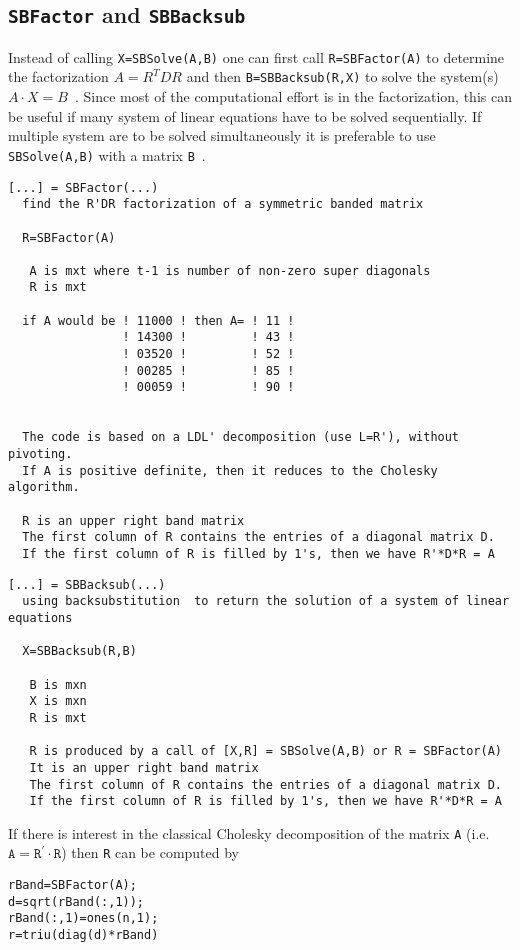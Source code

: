 \documentclass[11pt]{article}
\begin{document}
\subsection{\texttt{SBFactor} and \texttt{SBBacksub}}
Instead of calling \texttt{X=SBSolve(A,B)} one can first call
\texttt{R=SBFactor(A)} to determine the factorization $A=R^TDR$ and
then \texttt{B=SBBacksub(R,X)} to solve the system(s) $A\cdot X=B$~.
Since most of the computational effort is in the factorization, this can be
useful if many system of linear equations have to be solved sequentially.
If multiple system are to be solved simultaneously it is preferable to use
\texttt{SBSolve(A,B)} with a matrix \texttt{B}~.

\begin{verbatim}
[...] = SBFactor(...)
  find the R'DR factorization of a symmetric banded matrix

  R=SBFactor(A)

   A is mxt where t-1 is number of non-zero super diagonals
   R is mxt

  if A would be ! 11000 ! then A= ! 11 !
                ! 14300 !         ! 43 !
                ! 03520 !         ! 52 !
                ! 00285 !         ! 85 !
                ! 00059 !         ! 90 !


  The code is based on a LDL' decomposition (use L=R'), without pivoting.
  If A is positive definite, then it reduces to the Cholesky algorithm.

  R is an upper right band matrix
  The first column of R contains the entries of a diagonal matrix D.
  If the first column of R is filled by 1's, then we have R'*D*R = A
\end{verbatim}

\begin{verbatim}
[...] = SBBacksub(...)
  using backsubstitution  to return the solution of a system of linear equations

  X=SBBacksub(R,B)

   B is mxn
   X is mxn
   R is mxt

   R is produced by a call of [X,R] = SBSolve(A,B) or R = SBFactor(A)
   It is an upper right band matrix
   The first column of R contains the entries of a diagonal matrix D.
   If the first column of R is filled by 1's, then we have R'*D*R = A
\end{verbatim}


If there is interest in the classical Cholesky decomposition
  of the matrix \texttt{A} 
(i.e. $\mathtt{A}=\mathtt{R}^\prime\cdot \mathtt{R}$) then \texttt{R} can be
computed by
\begin{verbatim}
rBand=SBFactor(A);
d=sqrt(rBand(:,1));
rBand(:,1)=ones(n,1);
r=triu(diag(d)*rBand)
\end{verbatim}
\end{document}
